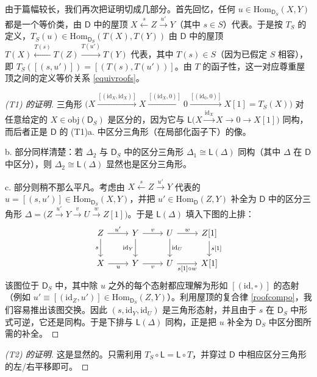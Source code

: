 由于篇幅较长，我们再次把证明切成几部分。首先回忆，任何 $u\in\text{Hom}_{\mathsf{D}_S}(X,Y)$ 都是一个等价类，由 $\mathsf{D}$ 中的屋顶 $X\xleftarrow{s} Z\xrightarrow{u'} Y$（其中 $s\in S$）代表。于是按 $T_S$ 的定义，$T_S(u)\in\text{Hom}_{\mathsf{D}_S}(T(X),T(Y))$ 由 $\mathsf{D}$ 中的屋顶 $T(X)\xleftarrow{T(s)} T(Z)\xrightarrow{T(u')} T(Y)$ 代表，其中 $T(s)\in S$（因为已假定 $S$ 相容），即 $T_S([(s,u')])=[(T(s),T(u'))]$。由 $T$ 的函子性，这一对应尊重屋顶之间的定义等价关系 \eqref{equivroofs}。

\begin{proof}[(\textup{T1}) 的证明]
	三角形 $\big(X\!\xrightarrow{[(\text{id}_X,\text{id}_X)]} \!X\!\xrightarrow{[(\text{id}_X,0)]} 0\xrightarrow{[(\text{id}_0,0)]} \!X[1]\!=\!T_S(X)\big)$ 对任意给定的 $X\in\text{obj}(\mathsf{D}_S)$ 是区分的，因为它与 $\mathsf{L}\big(X\xrightarrow{\text{id}_X} X\rightarrow 0\rightarrow X[1]\big)$ 同构，而后者正是 $\mathsf{D}$ 的 (T1)a. 中区分三角形（在局部化函子下）的像。
	
	b. 部分同样清楚：若 $\Delta_2$ 与 $\mathsf{D}_S$ 中的区分三角形 $\Delta_1\cong\mathsf{L}(\Delta)$ 同构（其中 $\Delta$ 在 $\mathsf{D}$ 中区分），则 $\Delta_2\cong\mathsf{L}(\Delta)$ 显然也是区分三角形。
	
	c. 部分则稍不那么平凡。考虑由 $X\xleftarrow{s} Z\xrightarrow{u'} Y$ 代表的 $u=[(s,u')]\in\text{Hom}_{\mathsf{D}_S}(X,Y)$，并把 $u'\in\text{Hom}_\mathsf{D}(Z,Y)$ 补全为 $\mathsf{D}$ 中的区分三角形 $\Delta=\big(Z\xrightarrow{u'} Y\xrightarrow{v} U\xrightarrow{w} Z[1]\big)$。于是 $\mathsf{L}(\Delta)$ 填入下图的上排：
	\[
	\begin{tikzcd}
		Z\arrow[r, "u'"]\arrow[d, "s"'] & Y\arrow[r, "v"]\arrow[d, "\text{id}_Y"'] & U\arrow[r, "w"]\arrow[d, "\text{id}_U"] & Z[1]\arrow[d, "{s[1]}"] \\
		X\arrow[r, "u"'] & Y\arrow[r, "v"'] & U\arrow[r, "{s[1]\circ w}"'] & X[1]
	\end{tikzcd}
	\]
	该图位于 $\mathsf{D}_S$ 中，其中除 $u$ 之外的每个态射都应理解为形如 $[(\text{id},\square)]$ 的态射（例如 $u'\equiv[(\text{id}_Z,u')]\in\text{Hom}_{\mathsf{D}_S}(Z,Y)$）。利用屋顶的复合律 \eqref{roofcompo}，我们容易推出该图交换。因此 $(s,\text{id}_Y,\text{id}_U)$ 是三角形态射，并且由于 $s$ 在 $\mathsf{D}_S$ 中形式可逆，它还是同构。于是下排与 $\mathsf{L}(\Delta)$ 同构，正是把 $u$ 补全为 $\mathsf{D}_S$ 中区分图所需的补全。
\end{proof}

\begin{proof}[(\textup{T2}) 的证明]
	这是显然的。只需利用 $T_S\circ\mathsf{L}=\mathsf{L}\circ T$，并穿过 $\mathsf{D}$ 中相应区分三角形的左/右平移即可。
\end{proof}

